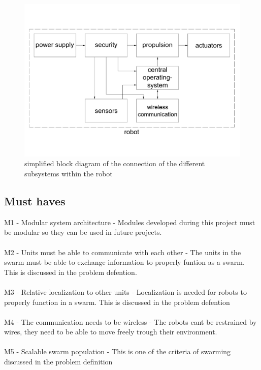 \documentclass[10pt,a4paper]{article}
\begin{document}
\begin{figure}[h]
    \centering
    \includegraphics[width=1\textwidth]{blockschematic}
    \caption{simplified block diagram of the connection of the different subsystems within the robot }
    \label{fig:blockschematic}
\end{figure}



\subsection{Must haves}


M1 - Modular system architecture - Modules developed during this project must be modular so they can be used in future projects.\\\\
M2 - Units must be able to communicate with each other - The units in the swarm must be able to exchange information to properly funtion as a swarm. This is discussed in the problem defention\cite{multidomaincom}.  \\\\
M3 - Relative localization to other units - Localization is needed for robots to properly function in a swarm. This is discussed in the problem defention\cite{multidomaincom}\\\\
M4 - The communication needs to be wireless - The robots cant be restrained by wires, they need to be able to move freely trough their environment.\\\\
M5 - Scalable swarm population - This is one of the criteria of swarming discussed in the problem definition\\\\
\end{document}
